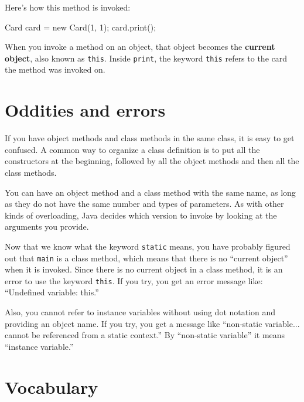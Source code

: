 Here's how this method is invoked:

\begin{code}
    Card card = new Card(1, 1);
    card.print();
\end{code}

When you invoke a method on an object, that object becomes the {\bf
current object}, also known as {\tt this}.  Inside {\tt print},
the keyword {\tt this} refers to the card the method was invoked on.


\section{Oddities and errors}


If you have object methods and class methods in the same class, it is
easy to get confused.  A common way to organize a class definition is
to put all the constructors at the beginning, followed by all the
object methods and then all the class methods.

You can have an object method and a class method with the same
name, as long as they do not have the same number and types of
parameters.  As with other kinds of overloading, Java decides
which version to invoke by looking at the arguments you provide.

Now that we know what the keyword {\tt static} means, you
have probably figured out that {\tt main} is a class method,
which means that there is no ``current object'' when it is invoked.
%
Since there is no current object in a class method, it is an
error to use the keyword {\tt this}.  If you try, you get
an error message like: ``Undefined variable: this.''

Also, you cannot refer to instance variables without using dot
notation and providing an object name.  If you try, you get a message
like ``non-static variable... cannot be referenced from a static
context.''  By ``non-static variable'' it means ``instance variable.''


\section{Vocabulary}

